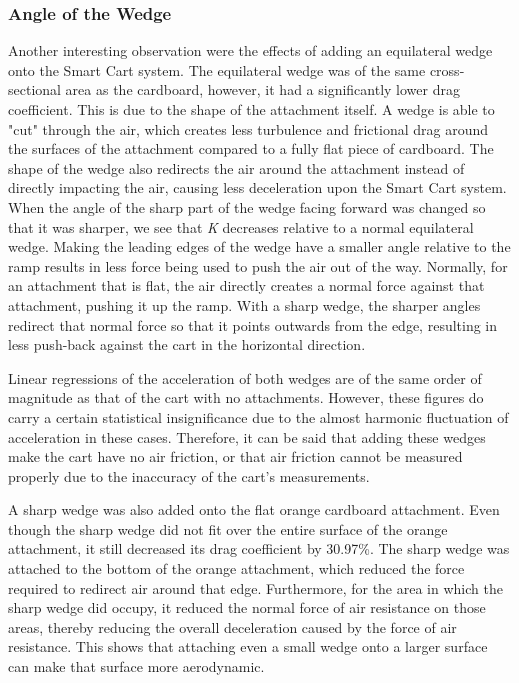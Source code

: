 \subsubsection{Angle of the Wedge}
Another interesting observation were the effects of adding an equilateral wedge onto the Smart Cart system. The equilateral wedge was of the same
cross-sectional area as the cardboard, however, it had a significantly lower drag coefficient. This is due to the shape of the
attachment itself. A wedge is able to "cut" through the air, which creates less turbulence and frictional drag around the surfaces
of the attachment compared to a fully flat piece of cardboard. The shape of the wedge also redirects the air around the attachment
instead of directly impacting the air, causing less deceleration upon the Smart Cart system.
When the angle of the sharp part of the wedge facing forward was changed so that it was sharper, we see that \textit{K}
decreases relative to a normal equilateral wedge. Making the leading edges of the wedge have a smaller angle relative
to the ramp results in less force being used to push the air out of the way. Normally, for an attachment that is flat, the air directly
creates a normal force against that attachment, pushing it up the ramp. With a sharp wedge, the sharper angles redirect that normal force
so that it points outwards from the edge, resulting in less push-back against the cart in the horizontal direction.

Linear regressions of the acceleration of both wedges are of the same order of magnitude as that of the cart with no attachments.
However, these figures do carry a certain statistical insignificance due to the almost harmonic fluctuation of acceleration in these cases.
Therefore, it can be said that adding these wedges make the cart have no air friction, or that air friction cannot be measured properly due to the 
inaccuracy of the cart's measurements.

A sharp wedge was also added onto the flat orange cardboard attachment. Even though the sharp wedge did not fit over the entire
surface of the orange attachment, it still decreased its drag coefficient by 30.97\%. The sharp wedge was attached to the bottom
of the orange attachment, which reduced the force required to redirect air around that edge. Furthermore, for the area in which the
sharp wedge did occupy, it reduced the normal force of air resistance on those areas, thereby reducing the overall deceleration
caused by the force of air resistance. This shows that attaching even a small wedge onto a larger surface can make that surface more
aerodynamic.

